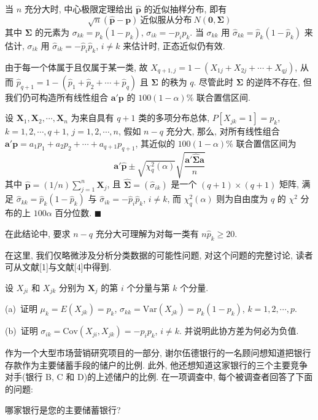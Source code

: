 当 $n$ 充分大时, 中心极限定理给出 $\hat{\mathbf{p}}$ 的近似抽样分布, 即有
\[
\sqrt{n}(\hat{\mathbf{p}}-\mathbf{p})\ \text{近似服从分布}\ N(\mathbf{0},\boldsymbol{\Sigma})
\]
其中 $\boldsymbol{\Sigma}$ 的元素为 $\sigma_{kk}=p_k(1-p_k)$, $\sigma_{ik}=-p_ip_k$. 当 $\sigma_{kk}$ 用 $\hat{\sigma}_{kk}=\hat{p}_k(1-\hat{p}_k)$ 来估计, $\sigma_{ik}$ 用 $\hat{\sigma}_{ik}=-\hat{p}_i\hat{p}_k$, $i\ne k$ 来估计时, 正态近似仍有效.

由于每一个体属于且仅属于某一类, 故 $X_{q+1,j}=1-(X_{1j}+X_{2j}+\cdots+X_{qj})$, 从而 $\hat{p}_{q+1}=1-(\hat{p}_1+\hat{p}_2+\cdots+\hat{p}_q)$ 且 $\boldsymbol{\Sigma}$ 的秩为 $q$. 尽管此时 $\boldsymbol{\Sigma}$ 的逆阵不存在, 但我们仍可构造所有线性组合 $\mathbf{a}'\mathbf{p}$ 的 $100(1-\alpha)\%$ 联合置信区间.

 设 $\mathbf{X}_1,\mathbf{X}_2,\cdots,\mathbf{X}_n$ 为来自具有 $q+1$ 类的多项分布总体, $P[X_{jk}=1]=p_k$, $k=1,2,\cdots,q+1$, $j=1,2,\cdots,n$, 假如 $n-q$ 充分大, 那么, 对所有线性组合 $\mathbf{a}'\mathbf{p}=a_1p_1+a_2p_2+\cdots+a_{q+1}p_{q+1}$, 其近似的 $100(1-\alpha)\%$ 联合置信区间为
\[
\mathbf{a}'\hat{\mathbf{p}}\pm\sqrt{\chi_q^2(\alpha)}\sqrt{\frac{\mathbf{a}'\hat{\boldsymbol{\Sigma}}\mathbf{a}}{n}}
\]
其中 $\hat{\mathbf{p}}=(1/n)\sum\limits_{j=1}^{n}\mathbf{X}_j$, 且 $\hat{\boldsymbol{\Sigma}}=(\hat{\sigma}_{ik})$ 是一个 $(q+1)\times(q+1)$ 矩阵, 满足 $\hat{\sigma}_{kk}=\hat{p}_k(1-\hat{p}_k)$ 与 $\hat{\sigma}_{ik}=-\hat{p}_i\hat{p}_k$, $i\ne k$, 而 $\chi_q^2(\alpha)$ 则为自由度为 $q$ 的 $\chi^2$ 分布的上 $100\alpha$ 百分位数. \hfill$\blacksquare$

在此结论中, 要求 $n-q$ 充分大可理解为对每一类有 $n\hat{p}_k\ge20$.

在这里, 我们仅略微涉及分析分类数据的可能性问题, 对这个问题的完整讨论, 读者可从文献[1]与文献[4]中得到.

\quad 设 $X_{ji}$ 和 $X_{jk}$ 分别为 $\mathbf{X}_j$ 的第 $i$ 个分量与第 $k$ 个分量.

(a)\ 证明 $\mu_k=E(X_{jk})=p_k$, $\sigma_{kk}=\mathrm{Var}(X_{jk})=p_k(1-p_k)$, $k=1,2,\cdots,p$.

(b)\ 证明 $\sigma_{ik}=\mathrm{Cov}(X_{ji},X_{jk})=-p_ip_k$, $i\ne k$. 并说明此协方差为何必为负值.

\quad 作为一个大型市场营销研究项目的一部分, 谢尔伍德银行的一名顾问想知道把银行存款作为主要储蓄手段的储户的比例. 此外, 他还想知道这家银行的三个主要竞争对手(银行 B, C 和 D)的上述储户的比例. 在一项调查中, 每个被调查者回答了下面的问题:

哪家银行是您的主要储蓄银行?

